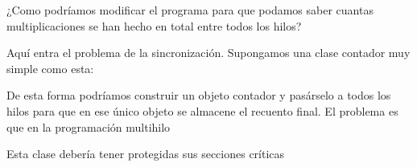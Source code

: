 \documentclass[letterpaper,10pt,spanish]{sphinxmanual}
\begin{document}
¿Como podríamos modificar el programa para que podamos saber cuantas multiplicaciones se han hecho en total entre todos los hilos?

Aquí entra el problema de la sincronización. Supongamos una clase contador muy simple como esta:

\begin{sphinxVerbatim}[commandchars=\\\{\}]
 
         
         
          
          
                 
\end{sphinxVerbatim}

De esta forma podríamos construir un objeto contador y pasárselo a todos los hilos para que en ese único objeto se almacene el recuento final. El problema es que en la programación multihilo 

Esta clase debería tener protegidas sus secciones críticas

\begin{sphinxVerbatim}[commandchars=\\\{\}]
 
         
         
           
           
                 
\end{sphinxVerbatim}
\end{document}
